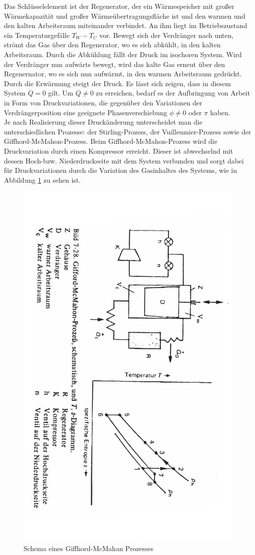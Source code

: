 \documentclass[parskip=half, a4paper,twoside,final]{article}
\begin{document}
Das Schlüsselelement ist der Regenerator, der ein Wärmespeicher mit großer Wärmekapazität und großer Wärmeübertragungsfläche ist und den warmen und den kalten Arbeitsraum miteinander verbindet. An ihm liegt im Betriebszustand ein Temperaturgefälle $T_W - T_C$ vor. Bewegt sich der Verdränger nach unten, strömt das Gas über den Regenerator, wo es sich abkühlt, in den kalten Arbeitsraum. Durch die Abkühlung fällt der Druck im isochoren System. Wird der Verdränger nun aufwärts bewegt, wird das kalte Gas erneut über den Regenernator, wo es sich nun aufwärmt, in den warmen Arbeitsraum gedrückt. Durch die Erwärmung steigt der Druck. Es lässt sich zeigen, dass in diesem System $\dot{Q} = 0 $ gilt. Um $\dot{Q} \neq 0 $ zu erreichen, bedarf es der Aufbringung von Arbeit in Form von Druckvariationen, die gegenüber den Variationen der Verdrängerposition eine geeignete Phasenverschiebung $\phi \neq 0$ oder $\pi$ haben. \\
Je nach Realisierung dieser Druckänderung unterscheidet man die unterschiedlichen Prozesse: der Stirling-Prozess, der Vuilleumier-Prozess sowie der Giffhord-McMahon-Prozess. Beim Giffhord-McMahon-Prozess wird die Druckvariation durch einen Kompressor erreicht. Dieser ist abwechselnd mit dessen Hoch-bzw. Niederdruckseite mit dem System verbunden und sorgt dabei für Druckvariationen durch die Variation des Gasinhaltes des Systems, wie in Abbildung \ref{fig:Giffhord-McMahon} zu sehen ist.

\begin{figure}[htp]
    \centering
        \includegraphics[height=0.9\textwidth, angle =90.7]{Bilder/McMahanMaschine.pdf}
    \caption{Schema eines Giffhord-McMahan Prozesses}
    \label{fig:Giffhord-McMahon}
\end{figure}
\end{document}
